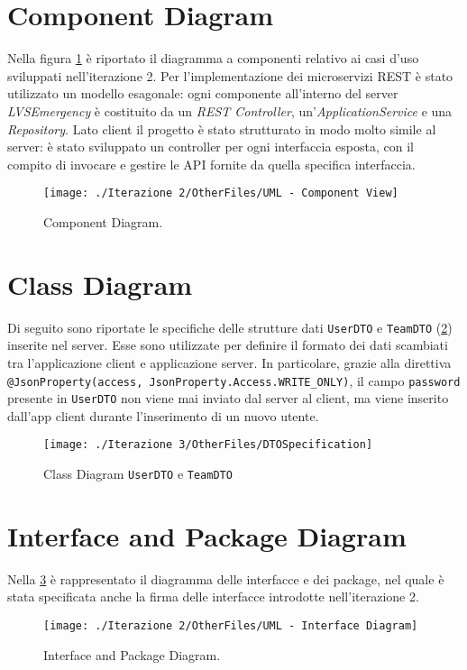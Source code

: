 \section{Component Diagram}
Nella figura \ref{fig:ComponentDiagram_iterazione2} è riportato il diagramma a componenti relativo ai casi d'uso sviluppati nell'iterazione 2. Per l'implementazione dei microservizi REST è stato utilizzato un modello esagonale: ogni componente all'interno del server \textit{LVSEmergency} è costituito da un \textit{REST Controller}, un'\textit{ApplicationService} e una \textit{Repository}.
Lato client il progetto è stato strutturato in modo molto simile al server: è stato sviluppato un controller per ogni interfaccia esposta, con il compito di invocare e gestire le API fornite da quella specifica interfaccia. 

\begin{figure}[h!]
	\centering
	\texttt{[image: ./Iterazione 2/OtherFiles/UML - Component View]}
	\caption{Component Diagram.}
	\label{fig:ComponentDiagram_iterazione2}
\end{figure}

\clearpage

\section{Class Diagram}
Di seguito sono riportate le specifiche delle strutture dati \texttt{UserDTO} e \texttt{TeamDTO} (\Fig\ref{fig:ClassDiagramDTO_iterazione2}) inserite nel server. Esse sono utilizzate per definire il formato dei dati scambiati tra l'applicazione client e applicazione server. In particolare, grazie alla direttiva \texttt{@JsonProperty(access, JsonProperty.Access.WRITE\_ONLY)}, il campo \texttt{password} presente in \texttt{UserDTO} non viene mai inviato dal server al client, ma viene inserito dall'app client durante l'inserimento di un nuovo utente.  

\begin{figure}[h!]
	\centering
	\texttt{[image: ./Iterazione 3/OtherFiles/DTOSpecification]}
	\caption{Class Diagram \texttt{UserDTO} e \texttt{TeamDTO}}
	\label{fig:ClassDiagramDTO_iterazione2}
\end{figure}

\clearpage

\section{Interface and Package Diagram}
Nella \Fig\ref{fig:InterfaceDiagram_iterazione2} è rappresentato il diagramma delle interfacce e dei package, nel quale è stata specificata anche la firma delle interfacce introdotte nell'iterazione 2.

\begin{figure}[h]
	\centering
	\texttt{[image: ./Iterazione 2/OtherFiles/UML - Interface Diagram]}
	\caption{Interface and Package Diagram.}
	\label{fig:InterfaceDiagram_iterazione2}
\end{figure}
